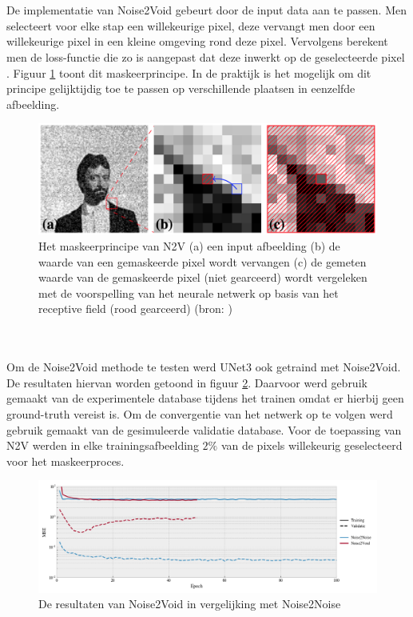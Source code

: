 \documentclass{report}
\begin{document}
\\ \\
De implementatie van Noise2Void gebeurt door de input data aan te passen. Men selecteert voor elke stap een willekeurige pixel, deze vervangt men door een willekeurige pixel in een kleine omgeving rond deze pixel. Vervolgens berekent men de loss-functie die zo is aangepast dat deze inwerkt op de geselecteerde pixel \cite{paper:n2v}. Figuur \ref{fig:tem_noise2void} toont dit maskeerprincipe. In de praktijk is het mogelijk om dit principe gelijktijdig toe te passen op verschillende plaatsen in eenzelfde afbeelding.
\begin{figure}[h!]
	\centering
	\includegraphics[width=12cm]{images/tem/noise2void.png}
	\caption{Het maskeerprincipe van N2V (a) een input afbeelding (b) de waarde van een gemaskeerde pixel wordt vervangen (c) de gemeten waarde van de gemaskeerde pixel (niet gearceerd) wordt vergeleken met de voorspelling van het neurale netwerk op basis van het receptive field (rood gearceerd) (bron: \cite{paper:n2v})}
	\label{fig:tem_noise2void}
\end{figure}
\\ \\
Om de Noise2Void methode te testen werd UNet3 ook getraind met Noise2Void. De resultaten hiervan worden getoond in figuur \ref{fig:nets_results_n2nn2v}. Daarvoor werd gebruik gemaakt van de experimentele database tijdens het trainen omdat er hierbij geen ground-truth vereist is. Om de convergentie van het netwerk op te volgen werd gebruik gemaakt van de gesimuleerde validatie database. Voor de toepassing van N2V werden in elke trainingsafbeelding $2\%$ van de pixels willekeurig geselecteerd voor het maskeerproces.
\begin{figure}[h!]
	\centering
	\includegraphics[width=15cm]{images/nets/results_n2nn2v.png}
	\caption{De resultaten van Noise2Void in vergelijking met Noise2Noise}
	\label{fig:nets_results_n2nn2v}
\end{figure}
\end{document}
